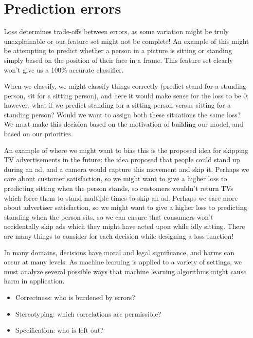 \section{Prediction errors}\label{sec:prediction_errors}
Loss determines trade-offs between errors, as some variation might be truly unexplainable or our feature set might not be complete!  An example of this might be attempting to predict whether a person in a picture is sitting or standing simply based on the position of their face in a frame.  This feature set clearly won't give us a 100\% accurate classifier. 

When we classify, we might classify things correctly (predict stand for a standing person, sit for a sitting person), and here it would make sense for the loss to be 0; however, what if we predict standing for a sitting person versus sitting for a standing person?  Would we want to assign both these situations the same loss?  We must make this decision based on the motivation of building our model, and based on our priorities.  

An example of where we might want to bias this is the proposed idea for skipping TV advertisements in the future: the idea proposed that people could stand up during an ad, and a camera would capture this movement and skip it.  Perhaps we care about customer satisfaction, so we might want to give a higher loss to predicting sitting when the person stands, so customers wouldn't return TVs which force them to stand multiple times to skip an ad.  Perhaps we care more about advertiser satisfaction, so we might want to give a higher loss to predicting standing when the person sits, so we can ensure that consumers won't accidentally skip ads which they might have acted upon while idly sitting.  There are many things to consider for each decision while designing a loss function!

In many domains, decisions have moral and legal significance, and harms can occur at many levels.  As machine learning is applied to a variety of settings, we must analyze several possible ways that machine learning algorithms might cause harm in application.  \\

\begin{itemize}
    \item Correctness: who is burdened by errors?
    \item Stereotyping: which correlations are permissible?
    \item Specification: who is left out?
\end{itemize}

